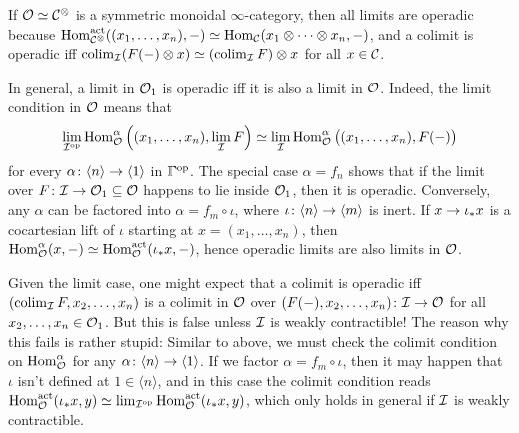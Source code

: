\begin{rem*}\label{rem*:OperadicLimits}
	If $\mathcal{O}\simeq \mathcal{C}^\otimes$ is a symmetric monoidal $\infty$-category, then all limits are operadic because $\operatorname{Hom}_{\mathcal{C}^\otimes}^\mathrm{act}((x_1,\dotsc,x_n),-)\simeq \operatorname{Hom}_{\mathcal{C}}(x_1\otimes\dotsb\otimes x_n,-)$, and a colimit is operadic iff $\operatorname*{colim}_{\mathcal{I}}(F(-)\otimes x)\simeq (\operatorname*{colim}_{\mathcal{I}} F)\otimes x$ for all $x\in\mathcal{C}$.
	
	In general, a limit in $\mathcal{O}_1$ is operadic iff it is also a limit in $\mathcal{O}$. Indeed, the limit condition in $\mathcal{O}$ means that
	\begin{equation*}
		\operatorname*{lim}_{\mathcal{I}^{\mathrm{op}}}\operatorname{Hom}_{\mathcal{O}}^\alpha\left((x_1,\dotsc,x_n),\operatorname*{lim}_{\mathcal{I}} F\right)\simeq \operatorname*{lim}_{\mathcal{I}}\operatorname{Hom}_{\mathcal{O}}^\alpha\big((x_1,\dotsc,x_n),F(-)\big)
	\end{equation*}
	for every $\alpha\colon \langle n\rangle\morphism \langle 1\rangle$ in $\IGamma^\op$. The special case $\alpha=f_n$ shows that if the limit over $F\colon \Ii\morphism \Oo_1\subseteq\Oo$ happens to lie inside $\mathcal{O}_1$, then it is operadic. Conversely, any $\alpha$ can be factored into $\alpha=f_m\circ \iota$, where $\iota\colon \langle n\rangle\morphism\langle m\rangle$ is inert. If $x\morphism \iota_*x$ is a cocartesian lift of $\iota$ starting at $x=(x_1,\dotsc,x_n)$, then $\operatorname{Hom}_{\mathcal{O}}^\alpha(x,-)\simeq \operatorname{Hom}_{\mathcal{O}}^\mathrm{act}(\iota_*x,-)$, hence operadic limits are also limits in $\mathcal{O}$.
	
	Given the limit case, one might expect that a colimit is operadic iff $(\operatorname*{colim}_{\mathcal{I}} F,x_2,\dotsc,x_n)$ is a colimit in $\mathcal{O}$ over $(F(-),x_2,\dotsc,x_n)\colon \Ii\morphism \Oo$ for all $x_2,\dotsc,x_n\in\mathcal{O}_1$. But this is false unless $\mathcal{I}$ is weakly contractible! The reason why this fails is rather stupid: Similar to above, we must check the colimit condition on $\operatorname{Hom}_{\mathcal{O}}^\alpha$ for any $\alpha\colon \langle n\rangle \morphism\langle 1\rangle$. If we factor $\alpha=f_m\circ \iota$, then it may happen that $\iota$ isn't defined at $1\in\langle n\rangle$, and in this case the colimit condition reads $\operatorname{Hom}_{\mathcal{O}}^\mathrm{act}(\iota_*x,y)\simeq \operatorname*{lim}_{\mathcal{I}^{\mathrm{op}}}\operatorname{Hom}_{\mathcal{O}}^\mathrm{act}(\iota_*x,y)$, which only holds in general if $\mathcal{I}$ is weakly contractible.
\end{rem*}


